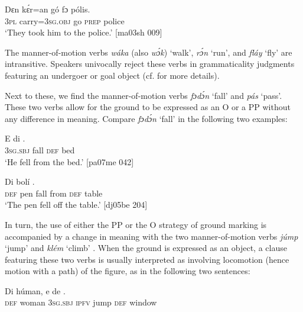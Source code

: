 \ea%
    \label{ex:key:959}
    \gll Dɛn  kɛ́r=an    gó  fɔ  pólis.\\
\textsc{3pl}  carry=\textsc{3sg.obj}  go  \textsc{prep}  police\\

\glt ‘They took him to the police.’ [ma03sh 009]
\z

The manner-of-motion verbs \textit{wáka} (also \textit{wɔ́k}) ‘walk’, \textit{rɔ́n} ‘run’, and \textit{fláy} ‘fly’ are intransitive. Speakers univocally reject these verbs in grammaticality judgments featuring an undergoer or goal object (cf.  for more details). 


Next to these, we find the manner-of-motion verbs \textit{fɔdɔ́n} ‘fall’ and \textit{pás} ‘pass’. These two verbs allow for the ground to be expressed as an O or a PP without any difference in meaning. Compare \textit{fɔdɔ́n} ‘fall’ in the following two examples: 



\ea%
    \label{ex:key:960}
    \gll E      di  .\\
\textsc{3sg.sbj}  fall    \textsc{def}  bed\\

\glt ‘He fell from the bed.’ [pa07me 042]
\z


\ea%
    \label{ex:key:961}
    \gll Di  bolí          .\\
\textsc{def}  pen  fall    from  \textsc{def}  table\\

\glt ‘The pen fell off the table.’ [dj05be 204]
\z

In turn, the use of either the PP or the O strategy of ground marking is accompanied by a change in meaning with the two manner-of-motion verbs \textit{júmp} ‘jump’  and \textit{klém} ‘climb’ . When the ground is expressed as an object, a clause featuring these two verbs is usually interpreted as involving locomotion (hence motion with a path) of the figure, as in the following two sentences:


\ea%
    \label{ex:key:962}
    \gll Di  húman,  e    de      .\\
\textsc{def}  woman  \textsc{3sg.sbj}  \textsc{ipfv}  jump  \textsc{def}  window\\

